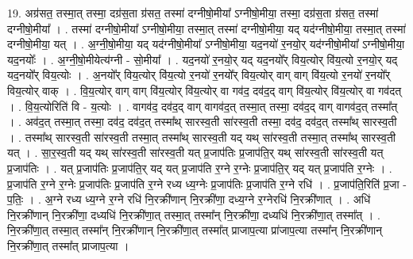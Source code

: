 \documentclass[17pt]{extarticle}
\begin{document}
19. अग्र॑सत॒ तस्मा॒त् तस्मा॒ दग्र॑स॒ता ग्र॑सत॒ तस्मा॑ दग्नीषो॒मीया᳚ ऽग्नीषो॒मीया॒ तस्मा॒ दग्र॑स॒ता ग्र॑सत॒ तस्मा॑ दग्नीषो॒मीया᳚ । . तस्मा॑ दग्नीषो॒मीया᳚ ऽग्नीषो॒मीया॒ तस्मा॒त् तस्मा॑ दग्नीषो॒मीया॒ यद् यद॑ग्नीषो॒मीया॒ तस्मा॒त् तस्मा॑ दग्नीषो॒मीया॒ यत् । . अ॒ग्नी॒षो॒मीया॒ यद् यद॑ग्नीषो॒मीया᳚ ऽग्नीषो॒मीया॒ यद॒नयो॑ र॒नयो॒र् यद॑ग्नीषो॒मीया᳚ ऽग्नीषो॒मीया॒ यद॒नयोः᳚ । . अ॒ग्नी॒षो॒मीयेत्य॑ग्नी - सो॒मीया᳚ । . यद॒नयो॑ र॒नयो॒र् यद् यद॒नयो᳚र् विय॒त्योर् वि॑य॒त्यो र॒नयो॒र् यद् यद॒नयो᳚र् विय॒त्योः । . अ॒नयो᳚र् विय॒त्योर् वि॑य॒त्यो र॒नयो॑ र॒नयो᳚र् विय॒त्योर् वाग् वाग् वि॑य॒त्यो र॒नयो॑ र॒नयो᳚र् विय॒त्योर् वाक् । . वि॒य॒त्योर् वाग् वाग् वि॑य॒त्योर् वि॑य॒त्योर् वा गव॑द॒ दव॑द॒द् वाग् वि॑य॒त्योर् वि॑य॒त्योर् वा गव॑दत् । . वि॒य॒त्योरिति॑ वि - य॒त्योः । . वागव॑द॒ दव॑द॒द् वाग् वागव॑द॒त् तस्मा॒त् तस्मा॒ दव॑द॒द् वाग् वागव॑द॒त् तस्मा᳚त् । . अव॑द॒त् तस्मा॒त् तस्मा॒ दव॑द॒ दव॑द॒त् तस्मा᳚थ् सारस्व॒ती सा॑रस्व॒ती तस्मा॒ दव॑द॒ दव॑द॒त् तस्मा᳚थ् सारस्व॒ती । . तस्मा᳚थ् सारस्व॒ती सा॑रस्व॒ती तस्मा॒त् तस्मा᳚थ् सारस्व॒ती यद् यथ् सा॑रस्व॒ती तस्मा॒त् तस्मा᳚थ् सारस्व॒ती यत् । . सा॒र॒स्व॒ती यद् यथ् सा॑रस्व॒ती सा॑रस्व॒ती यत् प्र॒जाप॑तिः प्र॒जाप॑ति॒र् यथ् सा॑रस्व॒ती सा॑रस्व॒ती यत् प्र॒जाप॑तिः । . यत् प्र॒जाप॑तिः प्र॒जाप॑ति॒र् यद् यत् प्र॒जाप॑ति र॒ग्ने र॒ग्नेः प्र॒जाप॑ति॒र् यद् यत् प्र॒जाप॑ति र॒ग्नेः । . प्र॒जाप॑ति र॒ग्ने र॒ग्नेः प्र॒जाप॑तिः प्र॒जाप॑ति र॒ग्ने रध्य ध्य॒ग्नेः प्र॒जाप॑तिः प्र॒जाप॑ति र॒ग्ने रधि॑ । . प्र॒जाप॑ति॒रिति॑ प्र॒जा - प॒तिः॒ । . अ॒ग्ने रध्य ध्य॒ग्ने र॒ग्ने रधि॑ नि॒रक्री॑णान् नि॒रक्री॑णा॒ दध्य॒ग्ने र॒ग्नेरधि॑ नि॒रक्री॑णात् । . अधि॑ नि॒रक्री॑णान् नि॒रक्री॑णा॒ दध्यधि॑ नि॒रक्री॑णा॒त् तस्मा॒त् तस्मा᳚न् नि॒रक्री॑णा॒ दध्यधि॑ नि॒रक्री॑णा॒त् तस्मा᳚त् । . नि॒रक्री॑णा॒त् तस्मा॒त् तस्मा᳚न् नि॒रक्री॑णान् नि॒रक्री॑णा॒त् तस्मा᳚त् प्राजाप॒त्या प्रा॑जाप॒त्या तस्मा᳚न् नि॒रक्री॑णान् नि॒रक्री॑णा॒त् तस्मा᳚त् प्राजाप॒त्या । \newline
\end{document}
